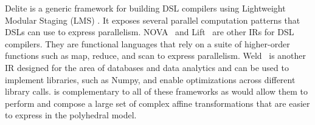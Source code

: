 Delite \cite{chafi_domain-specific_2011} is a generic
framework for building DSL compilers using Lightweight Modular Staging (LMS) \cite{lms_staging_10}. It exposes several parallel computation patterns that DSLs can use to express parallelism.
NOVA~\cite{Collins:2014:NFL:2627373.2627375} and Lift~\cite{Steuwer:2017:LFD:3049832.3049841} are other IRs for DSL compilers.  They are functional languages that rely on a suite of higher-order functions such as map, reduce, and scan to express parallelism.
Weld~\cite{palkar2017weld} is another IR designed for the area of databases and data analytics and can be used to implement libraries, such as Numpy, and enable optimizations across different library calls.
\framework{} is complementary to all of these frameworks as \framework{} would allow them to perform and compose a large set of complex affine transformations that are easier to express in the polyhedral model.

